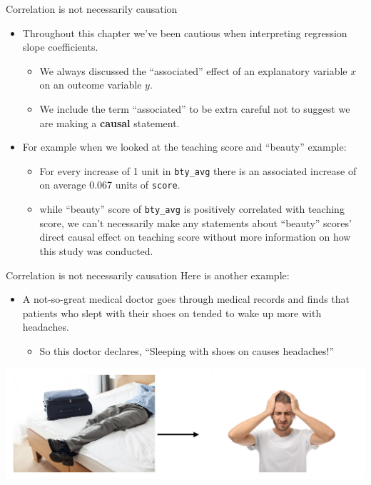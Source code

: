 \documentclass[
  ignorenonframetext,
]{beamer}
\providecommand{\tightlist}{%
  \setlength{\itemsep}{0pt}\setlength{\parskip}{0pt}}
\begin{document}
\begin{frame}[fragile]{Correlation is not necessarily causation}
\protect\hypertarget{correlation-is-not-necessarily-causation}{}
\begin{itemize}
\item
  Throughout this chapter we've been cautious when interpreting
  regression slope coefficients.

  \begin{itemize}
  \tightlist
  \item
    We always discussed the ``associated'' effect of an explanatory
    variable \(x\) on an outcome variable \(y\).
  \item
    We include the term ``associated'' to be extra careful not to
    suggest we are making a \textbf{causal} statement.
  \end{itemize}
\item
  For example when we looked at the teaching score and ``beauty''
  example:

  \begin{itemize}
  \item
    For every increase of 1 unit in \texttt{bty\_avg} there is an
    associated increase of on average 0.067 units of \texttt{score}.
  \item
    while ``beauty'' score of \texttt{bty\_avg} is positively correlated
    with teaching score, we can't necessarily make any statements about
    ``beauty'' scores' direct causal effect on teaching score without
    more information on how this study was conducted.
  \end{itemize}
\end{itemize}
\end{frame}

\begin{frame}{Correlation is not necessarily causation}
\protect\hypertarget{correlation-is-not-necessarily-causation-1}{}
Here is another example:

\begin{itemize}
\item
  A not-so-great medical doctor goes through medical records and finds
  that patients who slept with their shoes on tended to wake up more
  with headaches.

  \begin{itemize}
  \tightlist
  \item
    So this doctor declares, ``Sleeping with shoes on causes
    headaches!''
  \end{itemize}
\end{itemize}

\begin{center}\includegraphics[width=0.8\linewidth,height=0.35\textheight]{week4_7} \end{center}
\end{frame}
\end{document}
